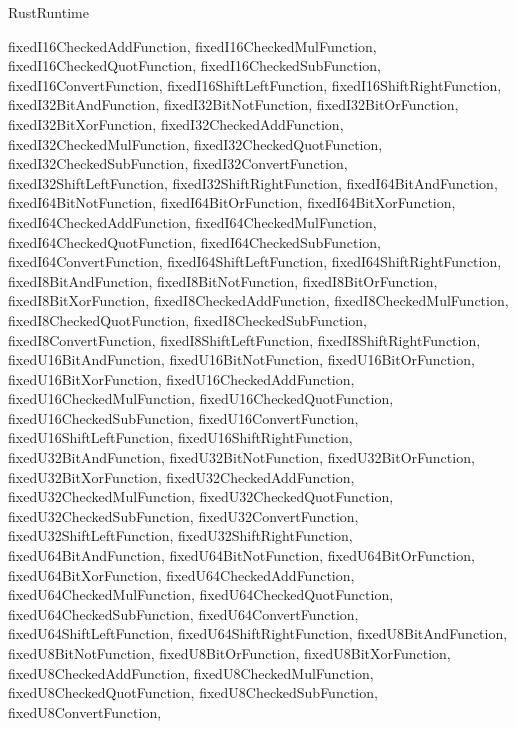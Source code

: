 \begin{lexlean}{RustRuntime}
\begin{semanticmodule}
{{      fixedI16CheckedAddFunction,
      fixedI16CheckedMulFunction,
      fixedI16CheckedQuotFunction,
      fixedI16CheckedSubFunction,
      fixedI16ConvertFunction,
      fixedI16ShiftLeftFunction,
      fixedI16ShiftRightFunction,
      fixedI32BitAndFunction,
      fixedI32BitNotFunction,
      fixedI32BitOrFunction,
      fixedI32BitXorFunction,
      fixedI32CheckedAddFunction,
      fixedI32CheckedMulFunction,
      fixedI32CheckedQuotFunction,
      fixedI32CheckedSubFunction,
      fixedI32ConvertFunction,
      fixedI32ShiftLeftFunction,
      fixedI32ShiftRightFunction,
      fixedI64BitAndFunction,
      fixedI64BitNotFunction,
      fixedI64BitOrFunction,
      fixedI64BitXorFunction,
      fixedI64CheckedAddFunction,
      fixedI64CheckedMulFunction,
      fixedI64CheckedQuotFunction,
      fixedI64CheckedSubFunction,
      fixedI64ConvertFunction,
      fixedI64ShiftLeftFunction,
      fixedI64ShiftRightFunction,
      fixedI8BitAndFunction,
      fixedI8BitNotFunction,
      fixedI8BitOrFunction,
      fixedI8BitXorFunction,
      fixedI8CheckedAddFunction,
      fixedI8CheckedMulFunction,
      fixedI8CheckedQuotFunction,
      fixedI8CheckedSubFunction,
      fixedI8ConvertFunction,
      fixedI8ShiftLeftFunction,
      fixedI8ShiftRightFunction,
      fixedU16BitAndFunction,
      fixedU16BitNotFunction,
      fixedU16BitOrFunction,
      fixedU16BitXorFunction,
      fixedU16CheckedAddFunction,
      fixedU16CheckedMulFunction,
      fixedU16CheckedQuotFunction,
      fixedU16CheckedSubFunction,
      fixedU16ConvertFunction,
      fixedU16ShiftLeftFunction,
      fixedU16ShiftRightFunction,
      fixedU32BitAndFunction,
      fixedU32BitNotFunction,
      fixedU32BitOrFunction,
      fixedU32BitXorFunction,
      fixedU32CheckedAddFunction,
      fixedU32CheckedMulFunction,
      fixedU32CheckedQuotFunction,
      fixedU32CheckedSubFunction,
      fixedU32ConvertFunction,
      fixedU32ShiftLeftFunction,
      fixedU32ShiftRightFunction,
      fixedU64BitAndFunction,
      fixedU64BitNotFunction,
      fixedU64BitOrFunction,
      fixedU64BitXorFunction,
      fixedU64CheckedAddFunction,
      fixedU64CheckedMulFunction,
      fixedU64CheckedQuotFunction,
      fixedU64CheckedSubFunction,
      fixedU64ConvertFunction,
      fixedU64ShiftLeftFunction,
      fixedU64ShiftRightFunction,
      fixedU8BitAndFunction,
      fixedU8BitNotFunction,
      fixedU8BitOrFunction,
      fixedU8BitXorFunction,
      fixedU8CheckedAddFunction,
      fixedU8CheckedMulFunction,
      fixedU8CheckedQuotFunction,
      fixedU8CheckedSubFunction,
      fixedU8ConvertFunction,
}}
\end{semanticmodule}
\end{lexlean}
